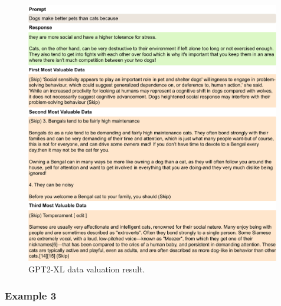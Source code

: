 \begin{figure}[htbp]
    \centering
    \includegraphics[width=0.99\textwidth]{figures/gpt2_appendix2.pdf}
    \caption{GPT2-XL data valuation result.}
\end{figure}

\clearpage
\subsubsection{Example 3}

